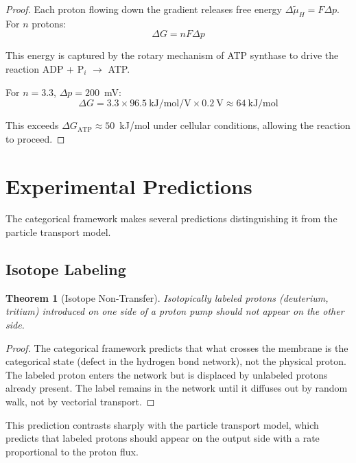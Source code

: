 \documentclass[twocolumn,showpacs,preprintnumbers,amsmath,amssymb,prd]{revtex4-2}
\newtheorem{theorem}{Theorem}[section]
\begin{document}
\begin{proof}
Each proton flowing down the gradient releases free energy $\Delta\tilde{\mu}_H = F\Delta p$. For $n$ protons:
\begin{equation}
\Delta G = n F \Delta p
\label{eq:coupling_energy}
\end{equation}

This energy is captured by the rotary mechanism of ATP synthase to drive the reaction ADP + P$_i$ $\to$ ATP.

For $n = 3.3$, $\Delta p = 200$~mV:
\begin{equation}
\Delta G = 3.3 \times 96.5~\text{kJ/mol/V} \times 0.2~\text{V} \approx 64~\text{kJ/mol}
\end{equation}

This exceeds $\Delta G_{\text{ATP}} \approx 50$~kJ/mol under cellular conditions, allowing the reaction to proceed.
\end{proof}


\section{Experimental Predictions}
\label{sec:predictions}

The categorical framework makes several predictions distinguishing it from the particle transport model.

\subsection{Isotope Labeling}

\begin{theorem}[Isotope Non-Transfer]
\label{thm:isotope}
Isotopically labeled protons (deuterium, tritium) introduced on one side of a proton pump should not appear on the other side.
\end{theorem}

\begin{proof}
The categorical framework predicts that what crosses the membrane is the categorical state (defect in the hydrogen bond network), not the physical proton. The labeled proton enters the network but is displaced by unlabeled protons already present. The label remains in the network until it diffuses out by random walk, not by vectorial transport.
\end{proof}

This prediction contrasts sharply with the particle transport model, which predicts that labeled protons should appear on the output side with a rate proportional to the proton flux.
\end{document}
